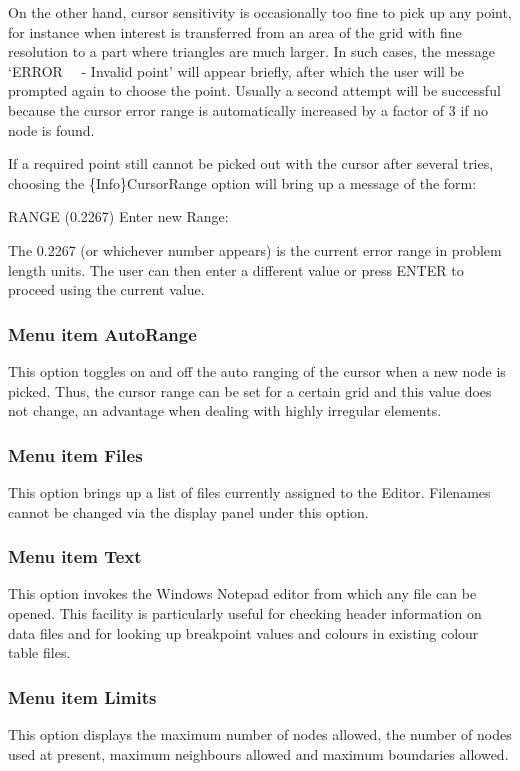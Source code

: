 \documentclass{article}
\begin{document}
On the other hand, cursor sensitivity is occasionally too fine to pick up any point, for instance when interest is transferred from an area of the grid with fine resolution to a part where triangles are much larger. In such cases, the message `ERROR \ \ {}- Invalid point' will appear briefly, after which the user will be prompted again to choose the point. Usually a second attempt will be successful because the cursor error range is automatically increased by a factor of 3 if no node is found.

If a required point still cannot be picked out with the cursor after several tries, choosing the \{Info\}CursorRange option will bring up a message of the form:

RANGE (0.2267) Enter new Range:

The 0.2267 (or whichever number appears) is the current error range in problem length units. The user can then enter a different value or press ENTER to proceed using the current value.

\subsubsection[Menu item AutoRange]{Menu item AutoRange}
This option toggles on and off the auto ranging of the cursor when a new node is picked. Thus, the cursor range can be set for a certain grid and this value does not change, an advantage when dealing with highly irregular elements.

\subsubsection[Menu item Files]{Menu item Files}
This option brings up a list of files currently assigned to the Editor. Filenames cannot be changed via the display panel under this option.

\subsubsection[Menu item Text]{Menu item Text}
This option invokes the Windows Notepad editor from which any file can be opened. This facility is particularly useful for checking header information on data files and for looking up breakpoint values and colours in existing colour table files.

\subsubsection[Menu item Limits]{Menu item Limits}
This option displays the maximum number of nodes allowed, the number of nodes used at present, maximum neighbours allowed and maximum boundaries allowed.
\end{document}
